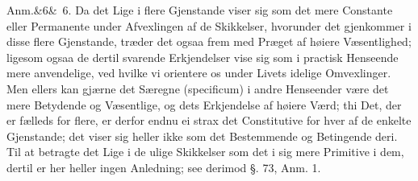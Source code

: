 \documentclass[12pt]{book}
\def\sperr#1{#1}%
\def\textit#1{#1}%
\newcommand{\sperr}[1]{\textls[180]{#1}}
\newcommand{\anm}[1]{%
  \par\vspace{0.5\baselineskip}%
  \noindent\hspace{\parindent}\sperr{Anm.}\ifx&#1&\else~\textit{#1}.\fi
  \enspace\ignorespaces
}
\begin{document}
\anm{6} Da det Lige i flere Gjenstande viser sig som det mere Constante eller
Permanente under Afvexlingen af de Skikkelser, hvorunder det gjenkommer i disse
flere Gjenstande, træder det ogsaa frem med Præget af høiere Væsentlighed;
ligesom ogsaa de dertil svarende Erkjendelser vise sig som i practisk Henseende
mere anvendelige, ved hvilke vi orientere os under Livets idelige Omvexlinger.
Men ellers kan gjærne det Særegne (\textit{specificum}) i andre Henseender være
det mere Betydende og Væsentlige, og dets Erkjendelse af høiere Værd; thi Det,
der er fælleds for flere, er derfor endnu ei strax det Constitutive for hver af
de enkelte Gjenstande; det viser sig heller ikke som det Bestemmende og
Betingende deri. Til at betragte det Lige i de ulige Skikkelser som det i sig
mere Primitive i dem, dertil er her heller ingen Anledning; see derimod §. 73,
Anm. 1.
\end{document}
